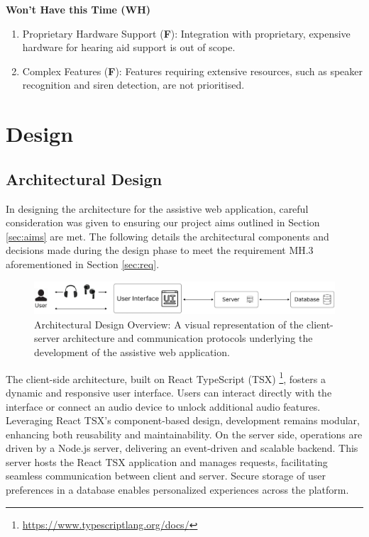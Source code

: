 \documentclass{l4proj}
\begin{document}
\textbf{Won’t Have this Time  (WH)}
\begin{enumerate}[{WH}.1]
  \item Proprietary Hardware Support (\textbf{F}): Integration with proprietary, expensive hardware for hearing aid support is out of scope.
  \item Complex Features (\textbf{F}): Features requiring extensive resources, such as speaker recognition and siren detection, are not prioritised.
\end{enumerate}

\chapter{Design}
\label{sec:design}


\section{Architectural Design}
\label{sec:arch-design}

In designing the architecture for the assistive web application, careful consideration was given to ensuring our project aims outlined in Section \ref{sec:aims} are met. The following details the architectural components and decisions made during the design phase to meet the requirement MH.3 aforementioned in Section \ref{sec:req}.

\begin{figure}
    \centering
    \includegraphics[width=\linewidth]{dissertation/images/architecture.png}    
    \caption{Architectural Design Overview: A visual representation of the client-server architecture and communication protocols underlying the development of the assistive web application.}
    \label{fig:architecture} 
\end{figure}

The client-side architecture, built on React TypeScript (TSX) \footnote{\url{https://www.typescriptlang.org/docs/}}, fosters a dynamic and responsive user interface. Users can interact directly with the interface or connect an audio device to unlock additional audio features. Leveraging React TSX's component-based design, development remains modular, enhancing both reusability and maintainability. On the server side, operations are driven by a Node.js server, delivering an event-driven and scalable backend. This server hosts the React TSX application and manages requests, facilitating seamless communication between client and server. Secure storage of user preferences in a database enables personalized experiences across the platform.
\end{document}
